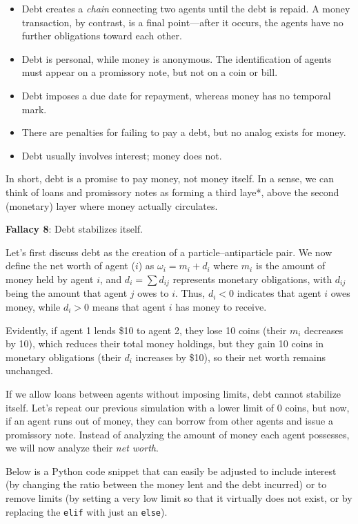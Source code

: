 \begin{itemize}
    \item Debt creates a \textit{chain} connecting two agents until the debt is repaid. A money transaction, by contrast, is a final point—after it occurs, the agents have no further obligations toward each other.
    \item Debt is personal, while money is anonymous. The identification of agents must appear on a promissory note, but not on a coin or bill.
    \item Debt imposes a due date for repayment, whereas money has no temporal mark.
    \item There are penalties for failing to pay a debt, but no analog exists for money.
    \item Debt usually involves interest; money does not.
\end{itemize}
In short, debt is a promise to pay money, not money itself. In a sense, we can think of loans and promissory notes as forming a third laye*, above the second (monetary) layer where money actually circulates.

\textbf{Fallacy 8}: Debt stabilizes itself.  

Let’s first discuss debt as the creation of a particle–antiparticle pair. We now define the net worth of agent ($i$) as  $\omega_i = m_i + d_i$
where $m_i$ is the amount of money held by agent $i$, and $d_i = \sum d_{ij}$ represents monetary obligations, with $d_{ij}$ being the amount that agent $j$ owes to $i$. Thus, $d_i < 0$ indicates that agent $i$ owes money, while $d_i > 0$ means that agent $i$ has money to receive.

Evidently, if agent 1 lends \$10 to agent 2, they lose 10 coins (their $m_i$ decreases by 10), which reduces their total money holdings, but they gain 10 coins in monetary obligations (their $ d_i $ increases by \$10), so their net worth remains unchanged.

If we allow loans between agents without imposing limits, debt cannot stabilize itself. Let’s repeat our previous simulation with a lower limit of 0 coins, but now, if an agent runs out of money, they can borrow from other agents and issue a promissory note. Instead of analyzing the amount of money each agent possesses, we will now analyze their \textit{net worth}.

Below is a Python code snippet that can easily be adjusted to include interest (by changing the ratio between the money lent and the debt incurred) or to remove limits (by setting a very low limit so that it virtually does not exist, or by replacing the \verb|elif| with just an \verb|else|).

